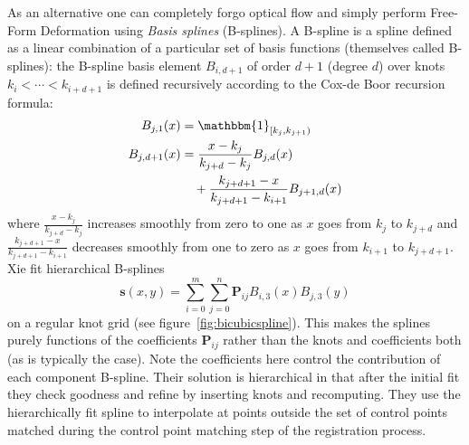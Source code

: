 As an alternative one can completely forgo optical flow and simply perform Free-Form Deformation\cite{xie2004} using \textit{Basis splines} (B-splines).
%
A B-spline is a spline defined as a linear combination of a particular set of basis functions (themselves called B-splines): the B-spline basis element \(B_{i, d+1}\) of order \(d+1\) (degree \(d\)) over knots \(k_i < \cdots < k_{i+d+1}\) is defined recursively according to the Cox-de Boor recursion formula\cite{de1971subroutine}:
\begin{align}
	B_{j,1} (x) &= \mathbbm{1}_{[k_j, k_{j+1})} \\
	B_{j,d+1} (x) &= \frac{x-k_j}{k_{j+d} - k_j} B_{j,d} (x) \\
	&\quad+ \frac{k_{j+d+1} - x}{k_{j+d+1} - k_{i+1}} B_{j+1,d} \nonumber (x)
\end{align}
where \(\frac{x-k_j}{k_{j+d} - k_j}\) increases smoothly from zero to one as \(x\) goes from \(k_j\) to \(k_{j+d}\) and \(\frac{k_{j+d+1} - x}{k_{j+d+1} - k_{i+1}}\) decreases smoothly from one to zero as \(x\) goes from \(k_{i+1}\) to \(k_{j+d+1}\).
%
Xie \etal\cite{xie2004} fit hierarchical B-splines 
\begin{equation}
	\mathbf{s}(x,y) = \sum_{i=0}^m\sum_{j=0}^n \mathbf{P}_{ij} B_{i,3}(x) B_{j,3}(y)
\end{equation}
on a regular knot grid (see figure~\ref{fig:bicubicspline}).
%
This makes the splines purely functions of the coefficients \(\mathbf{P}_{ij}\) rather than the knots and coefficients both (as is typically the case).
%
Note the coefficients here control the contribution of each component B-spline.
%
Their solution is hierarchical in that after the initial fit they check goodness and refine by inserting knots and recomputing.
%
They use the hierarchically fit spline to interpolate at points outside the set of control points matched during the control point matching step of the registration process.
%
